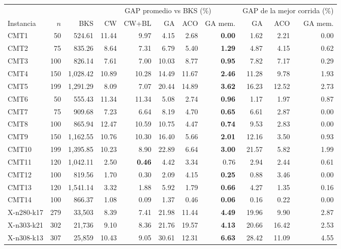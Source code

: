 \begin{tabular}{lrrrrrrrrrr}
\toprule
 & & & \multicolumn{5}{c}{GAP promedio vs BKS (\%)} & \multicolumn{3}{c}{GAP de la mejor corrida (\%)} \\
\cmidrule(lr){4-8}\cmidrule(lr){9-11}
Instancia & $n$ & BKS & CW & CW+BL & GA & ACO & GA mem. & GA & ACO & GA mem. \\
\midrule
CMT1 & 50 & 524.61 & 11.44 & 9.97 & 4.15 & 2.68 & \textbf{0.00} & 1.62 & 2.21 & 0.00 \\
CMT2 & 75 & 835.26 & 8.64 & 7.31 & 6.79 & 5.40 & \textbf{1.29} & 4.87 & 4.15 & 0.62 \\
CMT3 & 100 & 826.14 & 7.61 & 7.00 & 10.03 & 8.77 & \textbf{0.95} & 7.82 & 7.17 & 0.29 \\
CMT4 & 150 & 1,028.42 & 10.89 & 10.28 & 14.49 & 11.67 & \textbf{2.46} & 11.28 & 9.78 & 1.93 \\
CMT5 & 199 & 1,291.29 & 8.09 & 7.07 & 20.44 & 14.89 & \textbf{3.62} & 16.23 & 12.52 & 2.73 \\
CMT6 & 50 & 555.43 & 11.34 & 11.34 & 5.08 & 2.74 & \textbf{0.96} & 1.17 & 1.97 & 0.87 \\
CMT7 & 75 & 909.68 & 7.23 & 6.64 & 8.19 & 4.70 & \textbf{0.65} & 6.61 & 2.87 & 0.00 \\
CMT8 & 100 & 865.94 & 12.47 & 10.59 & 10.75 & 4.47 & \textbf{0.74} & 9.53 & 2.83 & 0.00 \\
CMT9 & 150 & 1,162.55 & 10.76 & 10.30 & 16.40 & 5.66 & \textbf{2.01} & 12.16 & 3.50 & 0.93 \\
CMT10 & 199 & 1,395.85 & 10.23 & 8.90 & 22.89 & 6.64 & \textbf{3.00} & 21.57 & 5.82 & 1.99 \\
CMT11 & 120 & 1,042.11 & 2.50 & \textbf{0.46} & 4.42 & 3.34 & 0.76 & 2.94 & 2.44 & 0.61 \\
CMT12 & 100 & 819.56 & 1.70 & 0.30 & 2.09 & 4.15 & \textbf{0.25} & 0.88 & 3.46 & 0.00 \\
CMT13 & 120 & 1,541.14 & 3.32 & 1.88 & 5.92 & 1.79 & \textbf{0.66} & 4.27 & 1.35 & 0.16 \\
CMT14 & 100 & 866.37 & 1.08 & 0.09 & 1.37 & 0.46 & \textbf{0.06} & 0.16 & 0.22 & 0.00 \\
\midrule
X-n280-k17 & 279 & 33,503 & 8.39 & 7.41 & 21.98 & 11.44 & \textbf{4.49} & 19.96 & 9.90 & 2.87 \\
X-n303-k21 & 302 & 21,736 & 9.10 & 8.36 & 21.76 & 19.57 & \textbf{4.13} & 20.66 & 16.42 & 2.53 \\
X-n308-k13 & 307 & 25,859 & 10.43 & 9.05 & 30.61 & 12.31 & \textbf{6.63} & 28.42 & 11.09 & 4.55 \\

\end{tabular}
